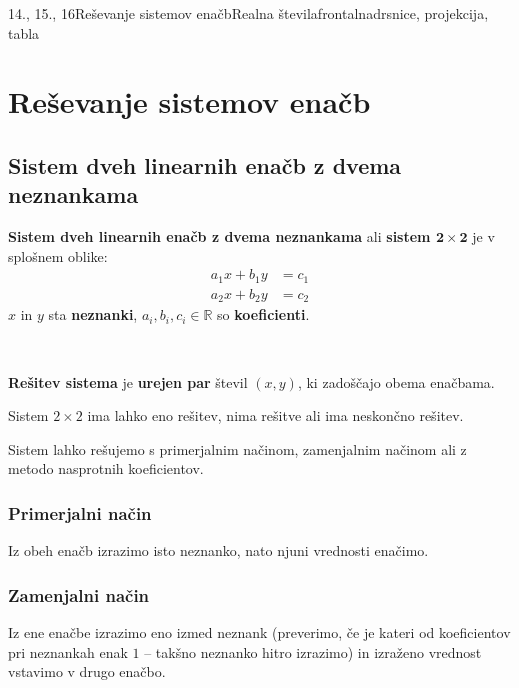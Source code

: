 \begin{priprava}{14., 15., 16}{}{Reševanje sistemov enačb}{Realna števila}{frontalna}{drsnice, projekcija, tabla}
    
    \section{Reševanje sistemov enačb}

        

            \subsection{Sistem dveh linearnih enačb z dvema neznankama}

                \textbf{Sistem dveh linearnih enačb z dvema neznankama} ali \textbf{sistem $\mathbf{2\times 2}$} je v splošnem oblike:
                    $$\begin{aligned}
                            a_1x+b_1y&=c_1 \\ a_2x+b_2y&=c_2
                        \end{aligned}$$
                $x$ in $y$ sta \textbf{neznanki}, $a_i,b_i,c_i\in\mathbb{R}$ so \textbf{koeficienti}.
            
~
            
                \textbf{Rešitev sistema} je \textbf{urejen par} števil $(x,y)$, ki zadoščajo obema enačbama.
            

            
                    Sistem $2\times 2$ ima lahko eno rešitev, nima rešitve ali ima neskončno rešitev.
            

        

        
            
                Sistem lahko rešujemo s primerjalnim načinom, zamenjalnim načinom ali z metodo nasprotnih koeficientov.
            
        
            \subsubsection*{Primerjalni način}
                Iz obeh enačb izrazimo isto neznanko, nato njuni vrednosti enačimo.
            

            \subsubsection*{Zamenjalni način}
                Iz ene enačbe izrazimo eno izmed neznank (preverimo, če je kateri od koeficientov pri neznankah enak $1$ -- takšno neznanko hitro izrazimo) in izraženo vrednost vstavimo v drugo enačbo.
            


\end{priprava}
